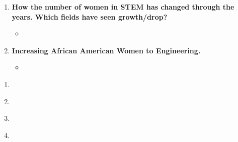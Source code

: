\documentclass[12pt,a4paper]{article}
\begin{document}
\begin{enumerate}
\begin{itemize}
    \end{itemize}
    \item {} \textbf{How the number of women in STEM has changed through the years. Which fields have seen growth/drop?}
    \begin{itemize}
      \item 
    \end{itemize}
    \item {} \textbf{Increasing African American Women to Engineering.}
    \begin{itemize}
      \item \href{https://www.nsbe.org/getattachment/News-Media/NSBE-News/ignored-potential/NSBE_IgnoredPotential_Whitepaper_TXT-FINAL.PDF.aspx}{} \imp{\&} 
    \end{itemize}
  \end{enumerate}

  \clearpage
  \begin{center}
    \large{}
  \end{center}
  \begin{enumerate}
    \item {} \href{https://www.youtube.com/watch?v=p12jUNsx5e0&feature=youtu.be}{}
    \item {} \href{https://www.youtube.com/watch?v=FKaOGuzhbM8#action=share}{}
    \item {} \href{https://ncses.nsf.gov/pubs/nsf19304/digest}{}
    \item {} \href{https://www.usatoday.com/story/news/nation/2019/10/18/nasa-astronauts-international-space-station-first-all-female-spacewalk/4020056002/}{}
  \end{enumerate}
  
\end{document}
